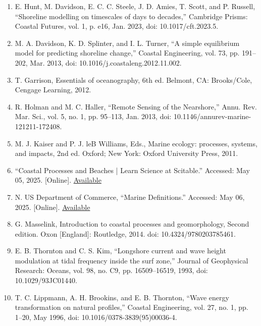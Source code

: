 \documentclass{article}
\begin{document}
{\begin{enumerate}
    \item {E. Hunt, M. Davidson, E. C. C. Steele, J. D. Amies, T. Scott, and P. Russell, “Shoreline modelling on timescales of days to decades,” Cambridge Prisms: Coastal Futures, vol. 1, p. e16, Jan. 2023, doi: 10.1017/cft.2023.5.}

    \item {M. A. Davidson, K. D. Splinter, and I. L. Turner, “A simple equilibrium model for predicting shoreline change,” Coastal Engineering, vol. 73, pp. 191–202, Mar. 2013, doi: 10.1016/j.coastaleng.2012.11.002.}

    \item {T. Garrison, Essentials of oceanography, 6th ed. Belmont, CA: Brooks/Cole, Cengage Learning, 2012.}

    \item {R. Holman and M. C. Haller, “Remote Sensing of the Nearshore,” Annu. Rev. Mar. Sci., vol. 5, no. 1, pp. 95–113, Jan. 2013, doi: 10.1146/annurev-marine-121211-172408.}

    \item {M. J. Kaiser and P. J. leB Williams, Eds., Marine ecology: processes, systems, and impacts, 2nd ed. Oxford; New York: Oxford University Press, 2011.}

    \item {“Coastal Processes and Beaches | Learn Science at Scitable.” Accessed: May 05, 2025. [Online]. \href{https://www.nature.com/scitable/knowledge/library/coastal-processes-and-beaches-26276621/}{Available}}

    \item {N. US Department of Commerce, “Marine Definitions.” Accessed: May 06, 2025. [Online]. \href{https://www.weather.gov/gum/MarineDefinitions}{Available}}

    \item {G. Masselink, Introduction to coastal processes and geomorphology, Second edition. Oxon [England]: Routledge, 2014. doi: 10.4324/9780203785461.}

    \item {E. B. Thornton and C. S. Kim, “Longshore current and wave height modulation at tidal frequency inside the surf zone,” Journal of Geophysical Research: Oceans, vol. 98, no. C9, pp. 16509–16519, 1993, doi: 10.1029/93JC01440.}

    \item {T. C. Lippmann, A. H. Brookins, and E. B. Thornton, “Wave energy transformation on natural profiles,” Coastal Engineering, vol. 27, no. 1, pp. 1–20, May 1996, doi: 10.1016/0378-3839(95)00036-4.}


\end{enumerate}}
\end{document}
